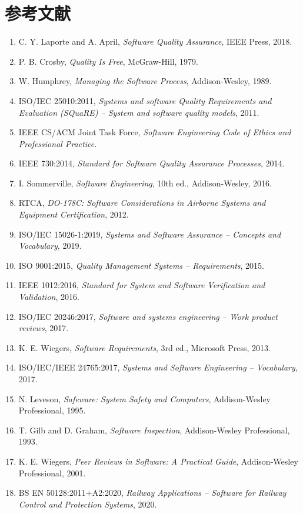 \documentclass[11pt,a4paper]{article}
\begin{document}
\section{参考文献}
\begin{enumerate}
  \item C. Y. Laporte and A. April, \textit{Software Quality Assurance}, IEEE Press, 2018.
  \item P. B. Crosby, \textit{Quality Is Free}, McGraw-Hill, 1979.
  \item W. Humphrey, \textit{Managing the Software Process}, Addison-Wesley, 1989.
  \item ISO/IEC 25010:2011, \textit{Systems and software Quality Requirements and Evaluation (SQuaRE) -- System and software quality models}, 2011.
  \item IEEE CS/ACM Joint Task Force, \textit{Software Engineering Code of Ethics and Professional Practice}.
  \item IEEE 730:2014, \textit{Standard for Software Quality Assurance Processes}, 2014.
  \item I. Sommerville, \textit{Software Engineering}, 10th ed., Addison-Wesley, 2016.
  \item RTCA, \textit{DO-178C: Software Considerations in Airborne Systems and Equipment Certification}, 2012.
  \item ISO/IEC 15026-1:2019, \textit{Systems and Software Assurance -- Concepts and Vocabulary}, 2019.
  \item ISO 9001:2015, \textit{Quality Management Systems -- Requirements}, 2015.
  \item IEEE 1012:2016, \textit{Standard for System and Software Verification and Validation}, 2016.
  \item ISO/IEC 20246:2017, \textit{Software and systems engineering -- Work product reviews}, 2017.
  \item K. E. Wiegers, \textit{Software Requirements}, 3rd ed., Microsoft Press, 2013.
  \item ISO/IEC/IEEE 24765:2017, \textit{Systems and Software Engineering -- Vocabulary}, 2017.
  \item N. Leveson, \textit{Safeware: System Safety and Computers}, Addison-Wesley Professional, 1995.
  \item T. Gilb and D. Graham, \textit{Software Inspection}, Addison-Wesley Professional, 1993.
  \item K. E. Wiegers, \textit{Peer Reviews in Software: A Practical Guide}, Addison-Wesley Professional, 2001.
  \item BS EN 50128:2011+A2:2020, \textit{Railway Applications -- Software for Railway Control and Protection Systems}, 2020.

\end{enumerate}
\end{document}
